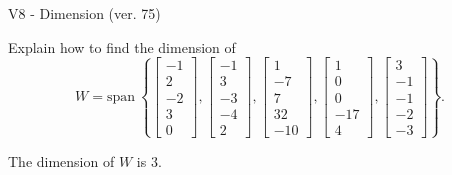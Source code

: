 \begin{exercise}
  \begin{exerciseTitle}V8 - Dimension (ver. 75)\end{exerciseTitle}
  \begin{exerciseStatement}
    Explain how to find the dimension of 
\[W=\mathrm{span}\ \left\{\left[\begin{array}{r}
-1 \\
2 \\
-2 \\
3 \\
0
\end{array}\right] , \left[\begin{array}{r}
-1 \\
3 \\
-3 \\
-4 \\
2
\end{array}\right] , \left[\begin{array}{r}
1 \\
-7 \\
7 \\
32 \\
-10
\end{array}\right] , \left[\begin{array}{r}
1 \\
0 \\
0 \\
-17 \\
4
\end{array}\right] , \left[\begin{array}{r}
3 \\
-1 \\
-1 \\
-2 \\
-3
\end{array}\right]\right\}.\]



  \end{exerciseStatement}
  \begin{exerciseAnswer}
   The dimension of \(W\) is  \(3\).
  


  \end{exerciseAnswer}
\end{exercise}